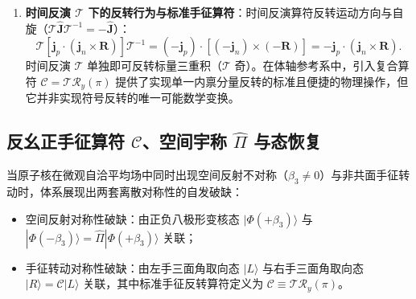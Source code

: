 \begin{enumerate}
\begin{equation}
\end{equation}
矩阵 $M_{\text{axial}}$ 的行列式为 $\det(M_{\text{axial}}) = (-1) \times (-1) \times (+1) = +1$。因此三个轴矢量的标量三重积在普通空间平面的镜像反射下严格保持不变：
\begin{equation}\label{eq:3-7-reflection-preserve}
\det[M_{\text{axial}}\mathbf{j}_p, M_{\text{axial}}\mathbf{j}_n, M_{\text{axial}}\mathbf{R}] = \det(M_{\text{axial}}) \det[\mathbf{j}_p, \mathbf{j}_n, \mathbf{R}] = +\mathbf{j}_p \cdot (\mathbf{j}_n \times \mathbf{R}).
\end{equation}
式~\eqref{eq:3-7-reflection-preserve} 证明：普通空间平面正交反射并不反转标量三重积 $\chi_{\text{geom}}$，因而该手征旋向性并非空间宇称奇（$\mathcal{P}$ 奇）的序参量。必须明确指出，标量积本身在反射下的不变性并不等同于整个取向核态或三矢量空间构型在普通空间反射下完全不变；
\item \textbf{时间反演 $\mathcal{T}$ 下的反转行为与标准手征算符}：时间反演算符反转运动方向与自旋（$\mathcal{T} \hat{\mathbf{J}} \mathcal{T}^{-1} = -\hat{\mathbf{J}}$）：
\begin{equation}\label{eq:3-7-triple-time-reversal}
\mathcal{T} \left[ \mathbf{j}_p \cdot (\mathbf{j}_n \times \mathbf{R}) \right] \mathcal{T}^{-1} = (-\mathbf{j}_p) \cdot \left[ (-\mathbf{j}_n) \times (-\mathbf{R}) \right] = - \mathbf{j}_p \cdot (\mathbf{j}_n \times \mathbf{R}).
\end{equation}
时间反演 $\mathcal{T}$ 单独即可反转标量三重积（$\mathcal{T}$ 奇）。在体轴参考系中，引入复合算符 $\mathcal{C} = \mathcal{T} \mathcal{R}_y(\pi)$ 提供了实现单一内禀分量反转的标准且便捷的物理操作，但它并非实现符号反转的唯一可能数学变换。
\end{enumerate}

\subsection{反幺正手征算符 $\mathcal{C}$、空间宇称 $\hat{\Pi}$ 与态恢复}\label{sec:3-7-3}

当原子核在微观自洽平均场中同时出现空间反射不对称（$\beta_3 \ne 0$）与非共面手征转动时，体系展现出两套离散对称性的自发破缺：
\begin{itemize}
\item 空间反射对称性破缺：由正负八极形变核态 $|\Phi(+\beta_3)\rangle$ 与 $|\Phi(-\beta_3)\rangle = \hat{\Pi} |\Phi(+\beta_3)\rangle$ 关联；
\item 手征转动对称性破缺：由左手三面角取向态 $|L\rangle$ 与右手三面角取向态 $|R\rangle = \mathcal{C} |L\rangle$ 关联，其中标准手征反转算符定义为 $\mathcal{C} \equiv \mathcal{T} \mathcal{R}_y(\pi)$。
\end{itemize}


